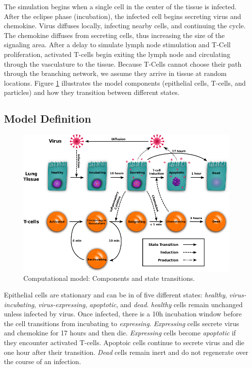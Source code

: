 \documentclass[10pt]{article}
\begin{document}
The simulation begins when a single cell in the center of the tissue is infected. After the eclipse phase (incubation), the infected cell begins secreting virus and chemokine. Virus diffuses locally, infecting nearby cells, and continuing the cycle. The chemokine diffuses from secreting cells, thus increasing the size of the signaling area. After a delay to simulate lymph node stimulation and T-Cell proliferation, activated T-cells begin exiting the lymph node and circulating through the vasculature to the tissue. Because T-Cells cannot choose their path through the branching network, we assume they arrive in tissue at random locations. Figure \ref{fig:modelchart} illustrates the model components 
(epithelial cells, T-cells, and particles) and how they transition between different states.


\subsection*{Model Definition}

\begin{figure}[ht!]
\begin{center}
\includegraphics[width=\textwidth]{ModelChart}
\end{center}
\caption{Computational model: Components and state transitions.}
\label{fig:modelchart}
\end{figure}

Epithelial cells are stationary and can be in of five different states: \emph{healthy}, \emph{virus-incubating}, \emph{virus-expressing}, \emph{apoptotic}, and \emph{dead}. \emph{healthy} cells remain unchanged unless infected by virus. Once infected, there is a 10h incubation window before the cell transitions from {incubating} to \emph{expressing}. \emph{Expressing} cells secrete virus and chemokine for 17 hours and then die. \emph{Expressing} cells become \emph{apoptotic} if they encounter activated T-cells. Apoptoic cells continue to secrete virus and die one hour after their transition. \emph{Dead} cells remain inert and do not regenerate over the course of an infection.
\end{document}
